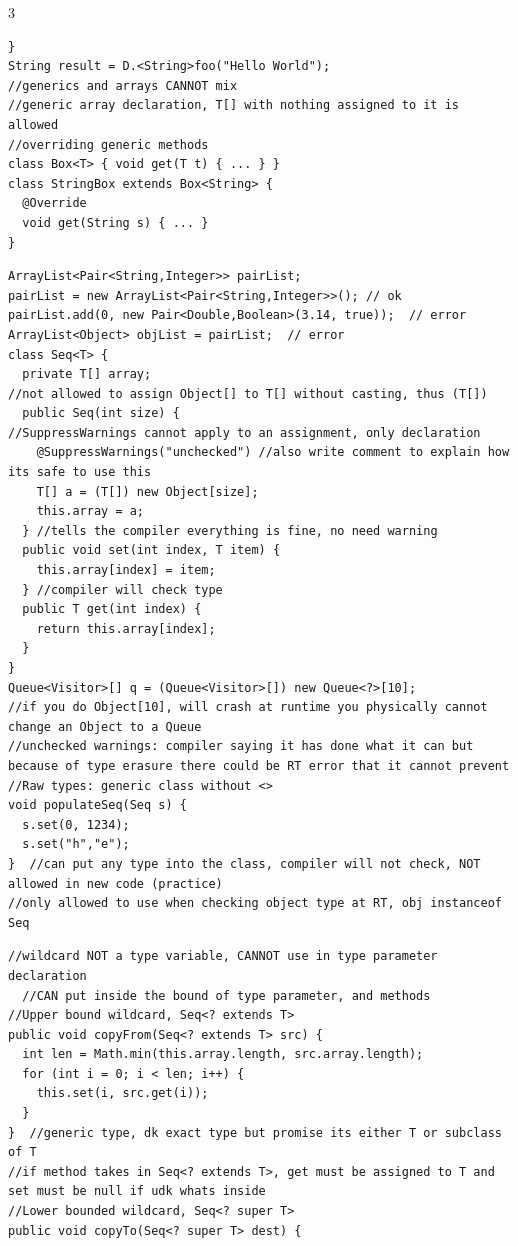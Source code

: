 \documentclass[10pt]{article}
\begin{document}
\begin{multicols*}{3}
\begin{verbatim}
}
String result = D.<String>foo("Hello World");
//generics and arrays CANNOT mix
//generic array declaration, T[] with nothing assigned to it is allowed
//overriding generic methods
class Box<T> { void get(T t) { ... } }
class StringBox extends Box<String> {
  @Override
  void get(String s) { ... }
}
\end{verbatim}
\begin{verbatim}
ArrayList<Pair<String,Integer>> pairList;
pairList = new ArrayList<Pair<String,Integer>>(); // ok
pairList.add(0, new Pair<Double,Boolean>(3.14, true));  // error
ArrayList<Object> objList = pairList;  // error
class Seq<T> {
  private T[] array;
//not allowed to assign Object[] to T[] without casting, thus (T[])
  public Seq(int size) {
//SuppressWarnings cannot apply to an assignment, only declaration
    @SuppressWarnings("unchecked") //also write comment to explain how its safe to use this
    T[] a = (T[]) new Object[size];
    this.array = a;
  } //tells the compiler everything is fine, no need warning
  public void set(int index, T item) {
    this.array[index] = item;
  } //compiler will check type
  public T get(int index) {
    return this.array[index];
  }
}
Queue<Visitor>[] q = (Queue<Visitor>[]) new Queue<?>[10];
//if you do Object[10], will crash at runtime you physically cannot change an Object to a Queue
//unchecked warnings: compiler saying it has done what it can but because of type erasure there could be RT error that it cannot prevent
//Raw types: generic class without <>
void populateSeq(Seq s) {
  s.set(0, 1234);
  s.set("h","e");
}  //can put any type into the class, compiler will not check, NOT allowed in new code (practice)
//only allowed to use when checking object type at RT, obj instanceof Seq
\end{verbatim}
\begin{verbatim}
//wildcard NOT a type variable, CANNOT use in type parameter declaration
  //CAN put inside the bound of type parameter, and methods
//Upper bound wildcard, Seq<? extends T>
public void copyFrom(Seq<? extends T> src) {
  int len = Math.min(this.array.length, src.array.length);
  for (int i = 0; i < len; i++) {
    this.set(i, src.get(i));
  }
}  //generic type, dk exact type but promise its either T or subclass of T
//if method takes in Seq<? extends T>, get must be assigned to T and set must be null if udk whats inside
//Lower bounded wildcard, Seq<? super T>
public void copyTo(Seq<? super T> dest) {

\end{verbatim}
\end{multicols*}
\end{document}
